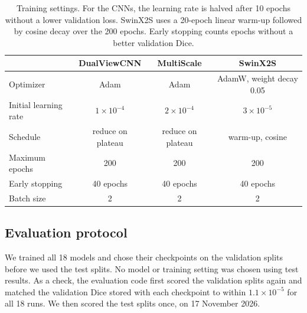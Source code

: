 \documentclass[11pt]{article}
\begin{document}
\begin{table}[t]
\centering
\caption{Training settings. For the CNNs, the learning rate is halved after 10 epochs without a lower validation loss. SwinX2S uses a 20-epoch linear warm-up followed by cosine decay over the 200 epochs. Early stopping counts epochs without a better validation Dice.}
\label{tab:training}
\small
\begin{tabular}{@{}lccc@{}}
\toprule
 & DualViewCNN & MultiScale & SwinX2S \\
\midrule
Optimizer & Adam & Adam & AdamW, weight decay 0.05 \\
Initial learning rate & $1\times10^{-4}$ & $2\times10^{-4}$ & $3\times10^{-5}$ \\
Schedule & reduce on plateau & reduce on plateau & warm-up, cosine \\
Maximum epochs & 200 & 200 & 200 \\
Early stopping & 40 epochs & 40 epochs & 40 epochs \\
Batch size & 2 & 2 & 2 \\
\bottomrule
\end{tabular}
\end{table}

\subsection{Evaluation protocol}
We trained all 18 models and chose their checkpoints on the validation splits before we used the test splits. No model or training setting was chosen using test results. As a check, the evaluation code first scored the validation splits again and matched the validation Dice stored with each checkpoint to within $1.1\times10^{-5}$ for all 18 runs. We then scored the test splits once, on 17 November 2026.
\end{document}

